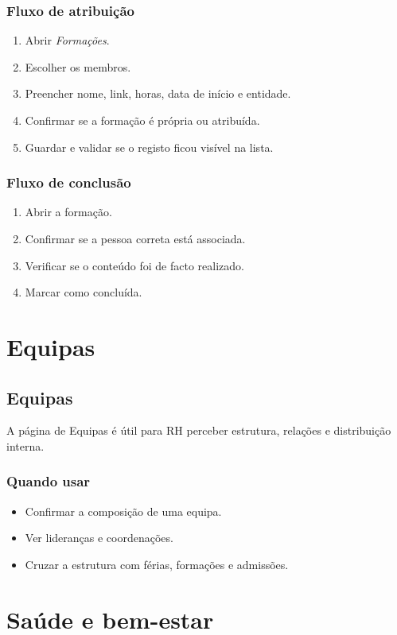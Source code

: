 \subsection{Fluxo de atribuição}
\begin{enumerate}
  \item Abrir \textit{Formações}.
  \item Escolher os membros.
  \item Preencher nome, link, horas, data de início e entidade.
  \item Confirmar se a formação é própria ou atribuída.
  \item Guardar e validar se o registo ficou visível na lista.
\end{enumerate}

\subsection{Fluxo de conclusão}
\begin{enumerate}
  \item Abrir a formação.
  \item Confirmar se a pessoa correta está associada.
  \item Verificar se o conteúdo foi de facto realizado.
  \item Marcar como concluída.
\end{enumerate}

\chapter{Equipas}
\section{Equipas}
A página de Equipas é útil para RH perceber estrutura, relações e distribuição interna.

\subsection{Quando usar}
\begin{itemize}
  \item Confirmar a composição de uma equipa.
  \item Ver lideranças e coordenações.
  \item Cruzar a estrutura com férias, formações e admissões.
\end{itemize}

\chapter{Saúde e bem-estar}
